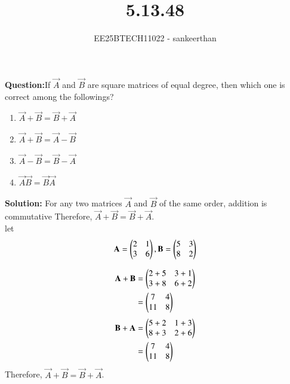\documentclass[journal]{IEEEtran}
\begin{document}


\title{5.13.48}
\author{EE25BTECH11022 - sankeerthan}
{\let\newpage\relax\maketitle}

\renewcommand{\thefigure}{\theenumi}
\renewcommand{\thetable}{\theenumi}
\setlength{\intextsep}{10pt} %


\renewcommand{\thetable}{\theenumi}

\textbf{Question:}If $\vec{A}$ and $\vec{B}$ are square matrices of equal degree, then which one is correct among the followings? 
\begin{enumerate}
    \item $\vec{A} + \vec{B} = \vec{B} + \vec{A}$
    \item $\vec{A} + \vec{B} = \vec{A} - \vec{B}$
    \item $\vec{A} - \vec{B} = \vec{B} - \vec{A}$
    \item $\vec{A}\vec{B} = \vec{B}\vec{A}$
\end{enumerate}

\textbf{Solution:}
For any two matrices $\vec{A}$ and $\vec{B}$ of the same order, addition is commutative
 Therefore, $\vec{A}+\vec{B} = \vec{B}+\vec{A}$. \\
 let
\begin{align}
\mathbf{A} = \begin{pmatrix}2 &1 \\3 &6\end{pmatrix},\mathbf{B} = \begin{pmatrix}5 &3 \\ 8 &2\end{pmatrix}     
\end{align}

\begin{align}
 \mathbf{A}+\mathbf{B} &= \begin{pmatrix}2+5 &3+1 \\3+8 &6+2\end{pmatrix} \\  
 &=\begin{pmatrix}7 &4 \\11 &8\end{pmatrix}
\end{align}
\begin{align}
 \mathbf{B}+\mathbf{A} &= \begin{pmatrix}5+2 &1+3 \\8+3 &2+6\end{pmatrix} \\  
 &=\begin{pmatrix}7 &4 \\11 &8\end{pmatrix}
\end{align}
Therefore, $\vec{A}+\vec{B} = \vec{B}+\vec{A}$.
\end{document}
